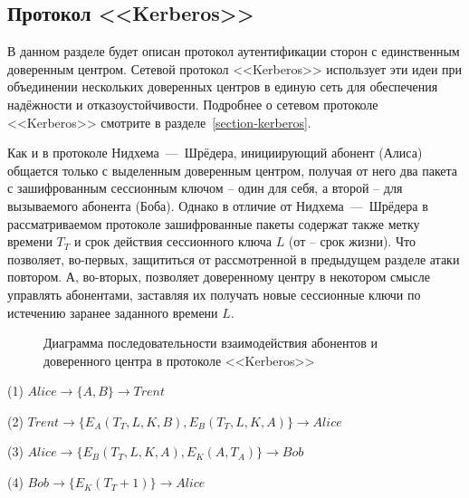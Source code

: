 \subsection{Протокол <<Kerberos>>}\label{section-protocols-kerberos}

В данном разделе будет описан протокол аутентификации сторон с единственным доверенным центром. Сетевой протокол <<Kerberos>> использует эти идеи при объединении нескольких доверенных центров в единую сеть для обеспечения надёжности и отказоустойчивости. Подробнее о сетевом протоколе <<Kerberos>> смотрите в разделе~\ref{section-kerberos}.

Как и в протоколе Нидхема~---~Шрёдера, инициирующий абонент (Алиса) общается только с выделенным доверенным центром, получая от него два пакета с зашифрованным сессионным ключом -- один для себя, а второй -- для вызываемого абонента (Боба). Однако в отличие от Нидхема~---~Шрёдера в рассматриваемом протоколе зашифрованные пакеты содержат также метку времени $T_T$ и срок действия сессионного ключа $L$ (от  -- срок жизни). Что позволяет, во-первых, защититься от рассмотренной в предыдущем разделе атаки повтором. А, во-вторых, позволяет доверенному центру в некотором смысле управлять абонентами, заставляя их получать новые сессионные ключи по истечению заранее заданного времени $L$.

\begin{figure}[thb]
	\centering
	\begin{sequencediagram}
		
	\end{sequencediagram}
	\caption{Диаграмма последовательности взаимодействия абонентов и доверенного центра в протоколе <<Kerberos>>\label{fig:key_distribution-kerberos}}
\end{figure}

\begin{protocol}
	\item[(1)] $ Alice \to \{ A, B \} \to Trent $
	\item[(2)] $ Trent \to \{ E_A \left( T_T, L, K, B \right), E_B \left( T_T, L, K, A \right) \} \to Alice $
	\item[(3)] $ Alice \to \{ E_B \left( T_T, L, K, A \right), E_K \left( A, T_A \right) \} \to Bob $
	\item[(4)] $ Bob \to \{ E_K \left( T_T + 1 \right) \} \to Alice $
\end{protocol}

